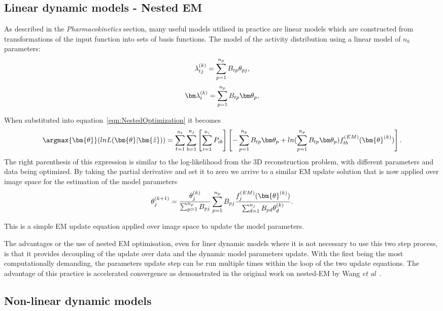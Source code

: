 \subsection{Linear dynamic models - Nested EM}
As described in the \textit{Pharmacokinetics} section, many useful models utilised in practice are linear models which are constructed from transformations of the input function into sets of basis functions.
The model of the activity distribution using a linear model of $n_b$ parameters:
\begin{equation}
\lambda_{tj}^{(k)} = \sum_{p=1}^{n_p} B_{tp}   \theta_{pj} \\, 
\end{equation}
\begin{equation}
\bm\lambda_{t}^{(k)} = \sum_{p=1}^{n_p} B_{tp}  \bm\theta_{p}  \\,
\end{equation}

When substituted into equation~\ref{eqn:NestedOptimization} it becomes
\begin{equation}
\argmax{\bm{\theta}}(lnL(\bm{\theta}|\bm{\hat{z}})) = 
\sum_{t=1}^{n_t} \sum_{b=1}^{n_j} \left[ \sum_{i=1}^{n_i}  P_{ib} \right]
\left[ 
-\sum_{p=1}^{n_p} B_{tp} \bm\theta_{p} + 
ln( \sum_{p=1}^{n_p} B_{tp} \bm\theta_{p}) 
f_{tb}^{(EM)}(\bm{\theta}^{(k)})
\right] \\ .
\end{equation}
The right parenthesis of this expression is similar to the log-likelihood from the 3D reconstruction problem, with different parameters and data being optimized. By taking the partial derivative and set it to zero we arrive to a similar EM update solution that is now applied over image space for the estimation of the model parameters 
\begin{equation}
\theta_j^{(k+1)} = \frac{\theta_j^{(k)}}
{\sum_{p=1}^{n_p} B_{pj}} 
\sum_{p=1}^{n_p} B_{pj} 
\frac{f_{j}^{(EM)}(\bm{\theta}^{(k)})}{\sum_{d=1}^{n_j} B_{pd}\theta_d^{(k)} } \\.
\label{eqn:NestedEM}
\end{equation}

This is a simple EM update equation applied over image space to update the model parameters. 

The advantages or the use of nested EM optimisation, even for liner dynamic models where it is not necessary to use this two step process, is that it provides decoupling of the update over data and the dynamic model parameters update. With the first being the most computationally demanding, the parameters update step can be run multiple times within the loop of the two update equations. The advantage of this practice is accelerated convergence as demonstrated in the original work on nested-EM by Wang \textit{et al}~\cite{Wang2010}. 





\subsection{Non-linear dynamic models}